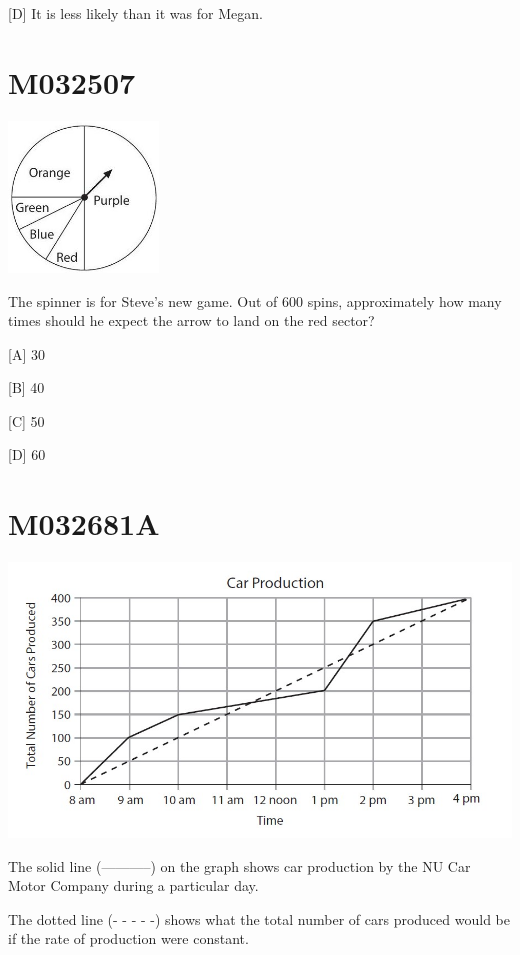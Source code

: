 \documentclass[12pt]{article}
\begin{document}
[D] It is less likely than it was for Megan.

\newpage
\section*{M032507}


\includegraphics[max width=0.3\textwidth]{2024_02_20_828ebc9d68bcc1fbb223g-72}


The spinner is for Steve's new game. Out of 600 spins, approximately how many times should he expect the arrow to land on the red sector?

[A] 30

[B] 40

[C] 50

[D] 60

\newpage
\section*{M032681A}

\includegraphics[max width=\textwidth]{2024_02_20_828ebc9d68bcc1fbb223g-73}

The solid line (-----------) on the graph shows car production by the NU Car Motor Company during a particular day.

The dotted line (- - - - -) shows what the total number of cars produced would be if the rate of production were constant.
\end{document}
